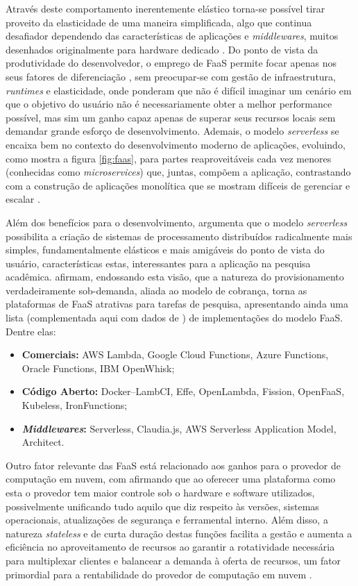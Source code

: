 \documentclass[english,brazilian]{UNISINOSmonografia} %
\begin{document}
Através deste comportamento inerentemente elástico torna-se possível tirar proveito da elasticidade de uma maneira simplificada, algo que continua desafiador dependendo das características de aplicações e \textit{middlewares}, muitos desenhados originalmente para hardware dedicado \cite{Jonas2017}.
Do ponto de vista da produtividade do desenvolvedor, o emprego de FaaS permite focar apenas nos seus fatores de diferenciação \cite{BoweiHan}, sem preocupar-se com gestão de infraestrutura, \textit{runtimes} e elasticidade, onde  ponderam que não é difícil imaginar um cenário em que o objetivo do usuário não é necessariamente obter a melhor performance possível, mas sim um ganho capaz apenas de superar seus recursos locais sem demandar grande esforço de desenvolvimento.
Ademais, o modelo \textit{serverless} se encaixa bem no contexto do desenvolvimento moderno de aplicações, evoluindo, como mostra a figura \autoref{fig:faas}, para partes reaproveitáveis cada vez menores (conhecidas como \textit{microservices}) que, juntas, compõem a aplicação, contrastando com a construção de aplicações monolítica que se mostram difíceis de gerenciar e escalar \cite{Eivy2017}.


Além dos benefícios para o desenvolvimento,  argumenta que o modelo \textit{serverless} possibilita a criação de sistemas de processamento distribuídos radicalmente mais simples, fundamentalmente elásticos e mais amigáveis do ponto de vista do usuário, características estas, interessantes para a aplicação na pesquisa acadêmica.
 afirmam, endossando esta visão, que a natureza do provisionamento verdadeiramente sob-demanda, aliada ao modelo de cobrança, torna as plataformas de FaaS atrativas para tarefas de pesquisa, apresentando ainda uma lista (complementada aqui com dados de ) de implementações do modelo FaaS. Dentre elas:
\begin{itemize}
	\item \textbf{Comerciais:} AWS Lambda, Google Cloud Functions, Azure Functions, Oracle Functions, IBM OpenWhisk;
	\item \textbf{Código Aberto:} Docker--LambCI, Effe, OpenLambda, Fission, OpenFaaS, Kubeless, IronFunctions;
	\item \textbf{\textit{Middlewares}:} Serverless, Claudia.js, AWS Serverless Application Model, Architect.
\end{itemize}


Outro fator relevante das FaaS está relacionado aos ganhos para o provedor de computação em nuvem, com  afirmando que ao oferecer uma plataforma como esta o provedor tem maior controle sob o hardware e software utilizados, possivelmente unificando tudo aquilo que diz respeito às versões, sistemas operacionais, atualizações de segurança e ferramental interno.
Além disso, a natureza \textit{stateless} e de curta duração destas funções facilita a gestão e aumenta a eficiência no aproveitamento de recursos ao garantir a rotatividade necessária para multiplexar clientes e balancear a demanda à oferta de recursos, um fator primordial para a rentabilidade do provedor de computação em nuvem \cite{Shankar2018}.
\end{document}

